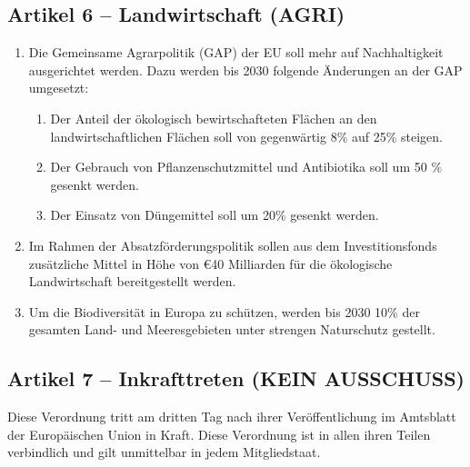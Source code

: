 \documentclass[12pt,a4paper]{article}
\begin{document}
\subsection*{Artikel 6 – Landwirtschaft (AGRI)}

\begin{enumerate}[leftmargin=2em, itemsep=2pt]
  \item Die Gemeinsame Agrarpolitik (GAP) der EU soll mehr auf Nachhaltigkeit ausgerichtet werden. Dazu werden bis 2030 folgende Änderungen an der GAP umgesetzt:
  \begin{enumerate}[label=\alph*., leftmargin=1.8em, itemsep=4pt]
    \item Der Anteil der ökologisch bewirtschafteten Flächen an den landwirtschaftlichen Flächen soll von gegenwärtig 8\% auf 25\% steigen.
    \item Der Gebrauch von Pflanzenschutzmittel und Antibiotika soll um 50 \% gesenkt werden.
    \item Der Einsatz von Düngemittel soll um 20\% gesenkt werden.
  \end{enumerate}
  \item Im Rahmen der Absatzförderungspolitik sollen aus dem Investitionsfonds zusätzliche Mittel in Höhe von \euro{}40 Milliarden für die ökologische Landwirtschaft bereitgestellt werden.
  \item Um die Biodiversität in Europa zu schützen, werden bis 2030 10\% der gesamten Land- und Meeresgebieten unter strengen Naturschutz gestellt.
\end{enumerate}

\subsection*{Artikel 7 – Inkrafttreten (KEIN AUSSCHUSS)}

Diese Verordnung tritt am dritten Tag nach ihrer Veröffentlichung im Amtsblatt der Europäischen Union in Kraft. Diese Verordnung ist in allen ihren Teilen verbindlich und gilt unmittelbar in jedem Mitgliedstaat.
\end{document}
